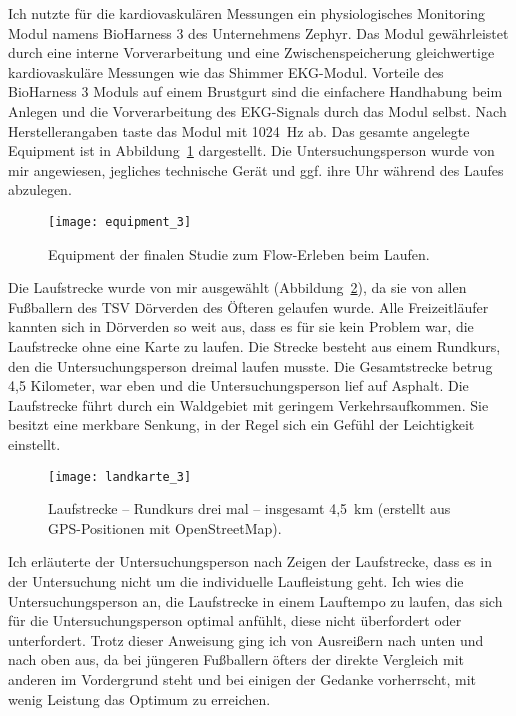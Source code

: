 Ich nutzte für die kardiovaskulären Messungen ein physiologisches Monitoring Modul namens BioHarness 3 des Unternehmens Zephyr. Das Modul gewährleistet durch eine interne Vorverarbeitung und eine Zwischenspeicherung gleichwertige kardiovaskuläre Messungen wie das Shimmer EKG-Modul. Vorteile des BioHarness 3 Moduls auf einem Brustgurt sind die einfachere Handhabung beim Anlegen und die Vorverarbeitung des \ac{EKG}-Signals durch das Modul selbst. Nach Herstellerangaben taste das Modul mit 1024~Hz ab. Das gesamte angelegte Equipment ist in Abbildung~\ref{fig:equipment_3} dargestellt. Die Untersuchungsperson wurde von mir angewiesen, jegliches technische Gerät und ggf. ihre Uhr während des Laufes abzulegen. 
\begin{figure}
	[!htb] \centering 
	\texttt{[image: equipment\_3]} \caption[Equipment der finalen Studie zum Flow-Erleben beim Laufen.]{Equipment der finalen Studie zum Flow-Erleben beim Laufen.} \label{fig:equipment_3} 
\end{figure}

Die Laufstrecke wurde von mir ausgewählt (Abbildung~\ref{fig:landkarte_3}), da sie von allen Fußballern des TSV Dörverden des Öfteren gelaufen wurde. Alle Freizeitläufer kannten sich in Dörverden so weit aus, dass es für sie kein Problem war, die Laufstrecke ohne eine Karte zu laufen. Die Strecke besteht aus einem Rundkurs, den die Untersuchungsperson dreimal laufen musste. Die Gesamtstrecke betrug 4,5 Kilometer, war eben und die Untersuchungsperson lief auf Asphalt. Die Laufstrecke führt durch ein Waldgebiet mit geringem Verkehrsaufkommen. Sie besitzt eine merkbare Senkung, in der Regel sich ein Gefühl der Leichtigkeit einstellt. 
\begin{figure}
	[!htb] \centering 
	\texttt{[image: landkarte\_3]} \caption[Laufstrecke -- Rundkurs.]{Laufstrecke -- Rundkurs drei mal -- insgesamt 4,5~km (erstellt aus GPS-Positionen mit OpenStreetMap).} \label{fig:landkarte_3} 
\end{figure}

Ich erläuterte der Untersuchungsperson nach Zeigen der Laufstrecke, dass es in der Untersuchung nicht um die individuelle Laufleistung geht. Ich wies die Untersuchungsperson an, die Laufstrecke in einem Lauftempo zu laufen, das sich für die Untersuchungsperson optimal anfühlt, diese nicht überfordert oder unterfordert. Trotz dieser Anweisung ging ich von Ausreißern nach unten und nach oben aus, da bei jüngeren Fußballern öfters der direkte Vergleich mit anderen im Vordergrund steht und bei einigen der Gedanke vorherrscht, mit wenig Leistung das Optimum zu erreichen. 

